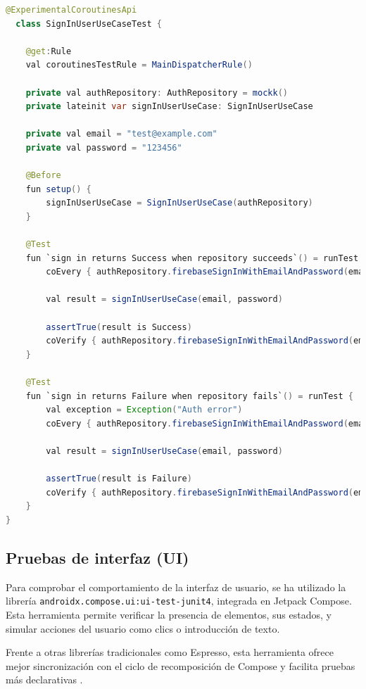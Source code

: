 \begin{lstlisting}[language=Java, caption={SignInUserUseCaseTest}, label={lst:signinTest}]
  @ExperimentalCoroutinesApi
  class SignInUserUseCaseTest {

    @get:Rule
    val coroutinesTestRule = MainDispatcherRule()

    private val authRepository: AuthRepository = mockk()
    private lateinit var signInUserUseCase: SignInUserUseCase

    private val email = "test@example.com"
    private val password = "123456"

    @Before
    fun setup() {
        signInUserUseCase = SignInUserUseCase(authRepository)
    }

    @Test
    fun `sign in returns Success when repository succeeds`() = runTest {
        coEvery { authRepository.firebaseSignInWithEmailAndPassword(email, password) } returns Success(true)

        val result = signInUserUseCase(email, password)

        assertTrue(result is Success)
        coVerify { authRepository.firebaseSignInWithEmailAndPassword(email, password) }
    }

    @Test
    fun `sign in returns Failure when repository fails`() = runTest {
        val exception = Exception("Auth error")
        coEvery { authRepository.firebaseSignInWithEmailAndPassword(email, password) } returns Failure(exception)

        val result = signInUserUseCase(email, password)

        assertTrue(result is Failure)
        coVerify { authRepository.firebaseSignInWithEmailAndPassword(email, password) }
    }
}
\end{lstlisting}

\subsection{Pruebas de interfaz (UI)}

Para comprobar el comportamiento de la interfaz de usuario, se ha utilizado la librería \texttt{androidx.compose.ui:ui-test-junit4}, integrada en Jetpack Compose. Esta herramienta permite verificar la presencia de elementos, sus estados, y simular acciones del usuario como clics o introducción de texto.

Frente a otras librerías tradicionales como Espresso, esta herramienta ofrece mejor sincronización con el ciclo de recomposición de Compose y facilita pruebas más declarativas \cite{android-testing}.

